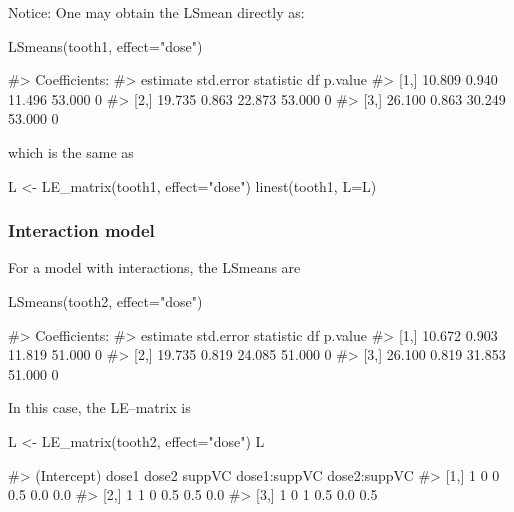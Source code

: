 Notice: One may obtain the LSmean directly as:

\begin{Schunk}
\begin{Sinput}
LSmeans(tooth1, effect="dose")
\end{Sinput}
\begin{Soutput}
#> Coefficients:
#>      estimate std.error statistic     df p.value
#> [1,]   10.809     0.940    11.496 53.000       0
#> [2,]   19.735     0.863    22.873 53.000       0
#> [3,]   26.100     0.863    30.249 53.000       0
\end{Soutput}
\end{Schunk}

which is the same as

\begin{Schunk}
\begin{Sinput}
L <- LE_matrix(tooth1, effect="dose")
linest(tooth1, L=L)
\end{Sinput}
\end{Schunk}

\hypertarget{interaction-model}{%
\subsubsection{Interaction model}\label{interaction-model}}

For a model with interactions, the LSmeans are

\begin{Schunk}
\begin{Sinput}
LSmeans(tooth2, effect="dose")
\end{Sinput}
\begin{Soutput}
#> Coefficients:
#>      estimate std.error statistic     df p.value
#> [1,]   10.672     0.903    11.819 51.000       0
#> [2,]   19.735     0.819    24.085 51.000       0
#> [3,]   26.100     0.819    31.853 51.000       0
\end{Soutput}
\end{Schunk}

In this case, the LE--matrix is

\begin{Schunk}
\begin{Sinput}
L <- LE_matrix(tooth2, effect="dose")
L
\end{Sinput}
\begin{Soutput}
#>      (Intercept) dose1 dose2 suppVC dose1:suppVC dose2:suppVC
#> [1,]           1     0     0    0.5          0.0          0.0
#> [2,]           1     1     0    0.5          0.5          0.0
#> [3,]           1     0     1    0.5          0.0          0.5
\end{Soutput}
\end{Schunk}

